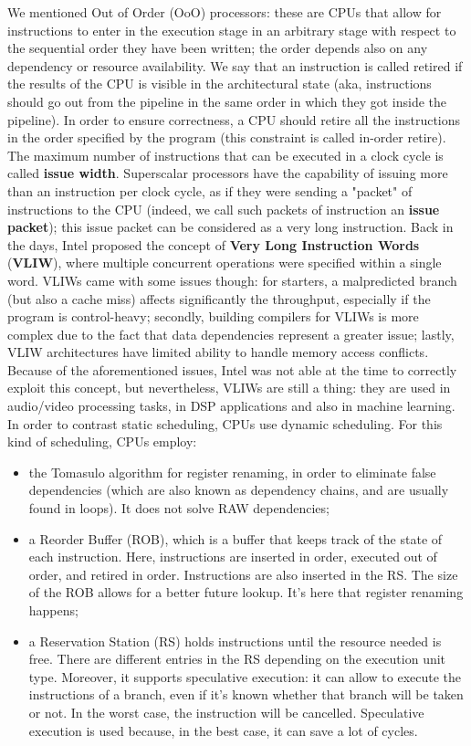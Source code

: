 We mentioned Out of Order (OoO) processors: these are CPUs that allow for instructions to enter in the execution stage in an arbitrary stage with respect to the sequential order they have been written; the order depends also on any dependency or resource availability. We say that an instruction is called retired if the results of the CPU is visible in the architectural state (aka, instructions should go out from the pipeline in the same order in which they got inside the pipeline). In order to ensure correctness, a CPU should retire all the instructions in the order specified by the program (this constraint is called in-order retire).
\nwl
The maximum number of instructions that can be executed in a clock cycle is called \textbf{issue width}. Superscalar processors have the capability of issuing more than an instruction per clock cycle, as if they were sending a "packet" of instructions to the CPU (indeed, we call such packets of instruction an \textbf{issue packet}); this issue packet can be considered as a very long instruction. Back in the days, Intel proposed the concept of \textbf{Very Long Instruction Words} (\textbf{VLIW}), where multiple concurrent operations were specified within a single word.
\nwl
VLIWs came with some issues though: for starters, a malpredicted branch (but also a cache miss) affects significantly the throughput, especially if the program is control-heavy; secondly, building compilers for VLIWs is more complex due to the fact that data dependencies represent a greater issue; lastly, VLIW architectures have limited ability to handle memory access conflicts.
\nwl
Because of the aforementioned issues, Intel was not able at the time to correctly exploit this concept, but nevertheless, VLIWs are still a thing: they are used in audio/video processing tasks, in DSP applications and also in machine learning. 
\nwl
In order to contrast static scheduling, CPUs use dynamic scheduling. For this kind of scheduling, CPUs employ:
\begin{itemize}
    \item the Tomasulo algorithm for register renaming, in order to eliminate false dependencies (which are also known as dependency chains, and are usually found in loops). It does not solve RAW dependencies;
    \item a Reorder Buffer (ROB), which is a buffer that keeps track of the state of each instruction. Here, instructions are inserted in order, executed out of order, and retired in order. Instructions are also inserted in the RS. The size of the ROB allows for a better future lookup. It's here that register renaming happens;
    \item a Reservation Station (RS) holds instructions until the resource needed is free. There are different entries in the RS depending on the execution unit type. Moreover, it supports speculative execution: it can allow to execute the instructions of a branch, even if it's known whether that branch will be taken or not. In the worst case, the instruction will be cancelled. Speculative execution is used because, in the best case, it can save a lot of cycles. 
\end{itemize}

